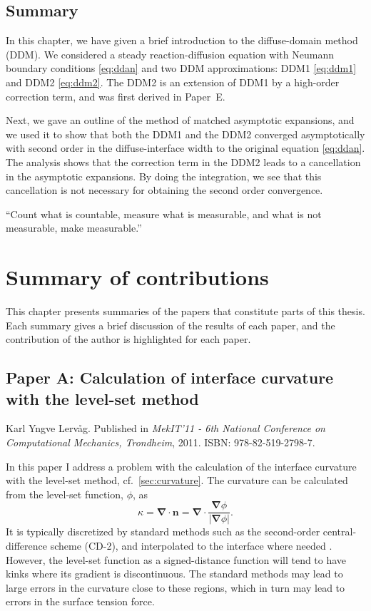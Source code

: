 \documentclass[11pt,b5paper,DIV=calc,BCOR1.3cm,headings=small,%
               footinclude=false,headsepline]{scrbook}
\newcommand*{\vct}[1]{\ensuremath{\boldsymbol{#1}}}
\newcommand*{\del}{\boldsymbol\nabla}
\renewcommand*{\div}{\del\cdot}
\newcommand*{\grad}{\del}
\begin{document}
\section{Summary}
In this chapter, we have given a brief introduction to the diffuse-domain
method (DDM).  We considered a steady reaction-diffusion equation with Neumann
boundary conditions \eqref{eq:ddan} and two DDM approximations:  DDM1
\eqref{eq:ddm1} and DDM2 \eqref{eq:ddm2}.  The DDM2 is an extension of DDM1 by
a high-order correction term, and was first derived in Paper~E.

Next, we gave an outline of the method of matched asymptotic expansions, and we
used it to show that both the DDM1 and the DDM2 converged asymptotically with
second order in the diffuse-interface width to the original equation
\eqref{eq:ddan}.  The analysis shows that the correction term in the DDM2 leads
to a cancellation in the asymptotic expansions.  By doing the integration, we
see that this cancellation is not necessary for obtaining the second order
convergence.

\begin{savequote}[7cm]
  ``Count what is countable, measure what is measurable, and what is not
  measurable, make measurable.''
\end{savequote}
\chapter{Summary of contributions}
\label{chap:contributions}
This chapter presents summaries of the papers that constitute parts of this
thesis.  Each summary gives a brief discussion of the results of each paper,
and the contribution of the author is highlighted for each paper.

\section[Paper A]{Paper A:  Calculation of interface curvature with the
  level-set method}
Karl Yngve Lervåg.  Published in \emph{MekIT'11 - 6th National Conference on
  Computational Mechanics, Trondheim}, 2011.  ISBN: 978-82-519-2798-7.

In this paper I address a problem with the calculation of the interface
curvature with the level-set method, cf.\ \cref{sec:curvature}.  The curvature
can be calculated from the level-set function, $\phi$, as
\begin{equation}
  \kappa = \div\vct n = \div\frac{\grad\phi}{|\grad\phi|}.
\end{equation}
It is typically discretized by standard methods such as the second-order
central-difference scheme (CD-2), and interpolated to the interface where
needed \cite{Osher88,Kang00,Osher03}.  However, the level-set function as
a signed-distance function will tend to have kinks where its gradient is
discontinuous.  The standard methods may lead to large errors in the curvature
close to these regions, which in turn may lead to errors in the surface tension
force.
\end{document}
